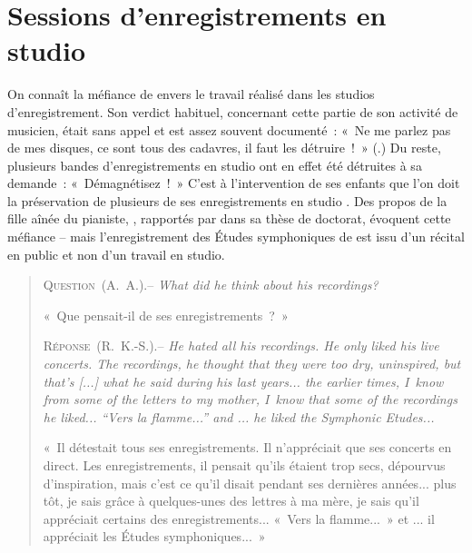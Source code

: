 \chapter[%
Sessions d'enregistrements en studio][%
Sessions d'enregistrements en studio]{%
Sessions d'enregistrements en studio}
\label{chap:Studio}

On connaît la méfiance de \VSofronitsky{} envers le travail réalisé dans les
studios d'enregistrement.
Son verdict habituel, concernant cette partie de son activité de musicien,
était sans appel et est assez souvent documenté~: «~Ne me parlez pas de mes
disques, ce sont tous des cadavres, il faut les détruire~!~»
(\citealt{Nikonovich08b}.)
Du reste, plusieurs bandes d'enregistrements en studio ont en effet été
détruites à sa demande~: «~Démagnétisez~!~»
C'est à l'intervention de ses enfants que l'on doit la préservation de
plusieurs de ses enregistrements en studio \citep[voir][p.~62]{Juban}.
Des propos de la fille aînée du pianiste, \RKoganSofronitskaya{}, rapportés
par \citet[p.~98]{Artese} dans sa thèse de doctorat, évoquent cette méfiance
-- mais l'enregistrement des Études symphoniques de \Schumann{} est issu
d'un récital en public et non d'un travail en studio.

\begin{quotation}
 \textsc{Question}~(A.~A.).--
 \foreignlanguage{english}{\emph{%
  What did he think about his recordings?}}

 «~Que pensait-il de ses enregistrements~?~»

 \textsc{Réponse}~(R.~K.-S.).--
 \foreignlanguage{english}{\emph{%
  He hated all his recordings.
  He only liked his live concerts.
  The recordings, he thought that they were too dry, uninspired, but that's
  [...] what he said during his last years... the earlier times, I~know from
  some of the letters to my mother, I~know that some of the recordings he
  liked... ``Vers la flamme...'' and \Schumann{}... he liked the Symphonic
  Etudes...}}

 «~Il détestait tous ses enregistrements.
 Il n'appréciait que ses concerts en direct.
 Les enregistrements, il pensait qu'ils étaient trop secs, dépourvus
 d'inspiration, mais c'est ce qu'il disait pendant ses dernières années...
 plus tôt, je sais grâce à quelques-unes des lettres à ma mère, je sais
 qu'il appréciait certains des enregistrements... «~Vers la flamme...~» et
 \Schumann{}... il appréciait les Études symphoniques...~»%
\end{quotation}

